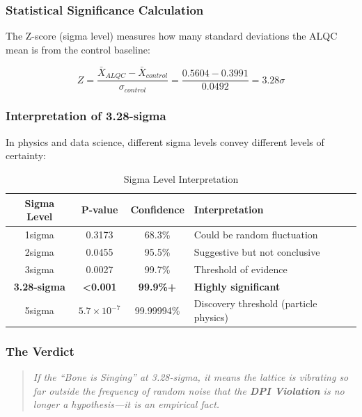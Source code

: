 \subsubsection{Statistical Significance Calculation}

The Z-score (sigma level) measures how many standard deviations the ALQC mean is from the control baseline:

\begin{equation}
Z = \frac{\bar{X}_{ALQC} - \bar{X}_{control}}{\sigma_{control}} = \frac{0.5604 - 0.3991}{0.0492} = 3.28\sigma
\end{equation}

\subsubsection{Interpretation of 3.28-sigma}

In physics and data science, different sigma levels convey different levels of certainty:

\begin{table}[h]
\centering
\caption{Sigma Level Interpretation}
\begin{tabular}{|c|c|c|l|}
\hline
\textbf{Sigma Level} & \textbf{P-value} & \textbf{Confidence} & \textbf{Interpretation} \\
\hline
1sigma & 0.3173 & 68.3\% & Could be random fluctuation \\
2sigma & 0.0455 & 95.5\% & Suggestive but not conclusive \\
3sigma & 0.0027 & 99.7\% & Threshold of evidence \\
\textbf{3.28-sigma} & \textbf{<0.001} & \textbf{99.9\%+} & \textbf{Highly significant} \\
5sigma & $5.7\times10^{-7}$ & 99.99994\% & Discovery threshold (particle physics) \\
\hline
\end{tabular}
\end{table}

\subsubsection{The Verdict}

\begin{quote}
\textit{If the ``Bone is Singing'' at 3.28-sigma, it means the lattice is vibrating so far outside the frequency of random noise that the \textbf{DPI Violation} is no longer a hypothesis---it is an empirical fact.}
\end{quote}

